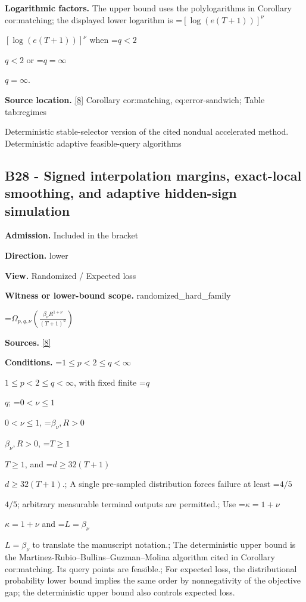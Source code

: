 \documentclass[10pt,a4paper]{article}
\newcommand{\AtlasMath}[1]{\par\begingroup\centering\setbox0=\hbox{$\displaystyle #1$}\ifdim\wd0>1.4\linewidth\typeout{ATLAS WIDE FORMULA: \the\wd0}\fi\ifdim\wd0>\linewidth\resizebox{\linewidth}{!}{\box0}\else\box0\fi\par\endgroup}
\newcommand{\AtlasInlineMath}[1]{\begingroup\setbox0=\hbox{$#1$}\ifdim\wd0>.4\linewidth\endgroup\AtlasMath{#1}\else\endgroup$#1$\fi}
\begin{document}
\textbf{Logarithmic factors.} The upper bound uses the polylogarithms in Corollary cor:matching; the displayed lower logarithm is \AtlasInlineMath{[\log(e(T+1))]^\nu} when \AtlasInlineMath{q<2} or \AtlasInlineMath{q=\infty}.



\textbf{Source location.} \href{https://github.com/WU-Wendao/Colombo/blob/main/colombo_sensorium/Complexity_altas/data/sources/colombo/B1/manuscript.pdf}{[8]} Corollary cor:matching, eq:error-sandwich; Table tab:regimes



Deterministic stable-selector version of the cited nondual accelerated method. Deterministic adaptive feasible-query algorithms



\subsection{B28 - Signed interpolation margins, exact-local smoothing, and adaptive hidden-sign simulation}


\textbf{Admission.} Included in the bracket



\textbf{Direction.} lower



\textbf{View.} Randomized / Expected loss



\textbf{Witness or lower-bound scope.} randomized\_hard\_family



\AtlasMath{\Omega_{p,q,\nu}\!\left(\frac{\beta_\nu R^{1+\nu}}{(T+1)^a}\right)}


\textbf{Sources.} \href{https://github.com/WU-Wendao/Colombo/blob/main/colombo_sensorium/Complexity_altas/data/sources/colombo/B1/manuscript.pdf}{[8]}



\textbf{Conditions.} \AtlasInlineMath{1\le p<2\le q<\infty}, with fixed finite \AtlasInlineMath{q}; \AtlasInlineMath{0<\nu\le1}, \AtlasInlineMath{\beta_\nu,R>0}, \AtlasInlineMath{T\ge1}, and \AtlasInlineMath{d\ge32(T+1)}.; A single pre-sampled distribution forces failure at least \AtlasInlineMath{4/5}; arbitrary measurable terminal outputs are permitted.; Use \AtlasInlineMath{\kappa=1+\nu} and \AtlasInlineMath{L=\beta_\nu} to translate the manuscript notation.; The deterministic upper bound is the Martinez-Rubio--Bullins--Guzman--Molina algorithm cited in Corollary cor:matching. Its query points are feasible.; For expected loss, the distributional probability lower bound implies the same order by nonnegativity of the objective gap; the deterministic upper bound also controls expected loss.
\end{document}
